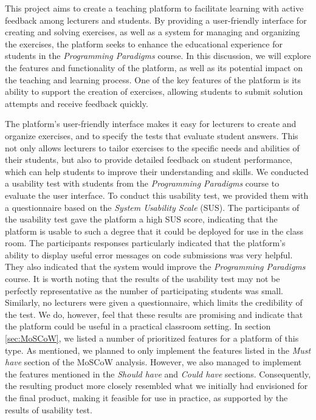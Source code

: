 This project aims to create a teaching platform to facilitate learning with active feedback among lecturers and students.
By providing a user-friendly interface for creating and solving exercises, as well as a system for managing and organizing the exercises, the platform seeks to enhance the educational experience for students in the \textit{Programming Paradigms} course.
In this discussion, we will explore the features and functionality of the platform, as well as its potential impact on the teaching and learning process.
One of the key features of the platform is its ability to support the creation of exercises, allowing students to submit solution attempts and receive feedback quickly.

The platform's user-friendly interface makes it easy for lecturers to create and organize exercises, and to specify the tests that evaluate student answers. This not only allows lecturers to tailor exercises to the specific needs and abilities of their students, but also to provide detailed feedback on student performance, which can help students to improve their understanding and skills.
We conducted a usability test with students from the \textit{Programming Paradigms} course to evaluate the user interface.
To conduct this usability test, we provided them with a questionnaire based on the \textit{System Usability Scale} (SUS).
The participants of the usability test gave the platform a high SUS score, indicating that the platform is usable to such a degree that it could be deployed for use in the class room. The participants responses particularly indicated that the platform's ability to display useful error messages on code submissions was very helpful.
They also indicated that the system would improve the \textit{Programming Paradigms} course.
It is worth noting that the results of the usability test may not be perfectly representative as the number of participating students was small.
Similarly, no lecturers were given a questionnaire, which limits the credibility of the test.
We do, however, feel that these results are promising and indicate that the platform could be useful in a practical classroom setting.
In section \ref{sec:MoSCoW}, we listed a number of prioritized features for a platform of this type.
As mentioned, we planned to only implement the features listed in the \textit{Must have} section of the MoSCoW analysis.
However, we also managed to implement the features mentioned in the \textit{Should have} and \textit{Could have} sections.
Consequently, the resulting product more closely resembled what we initially had envisioned for the final product, making it feasible for use in practice, as supported by the results of usability test.

